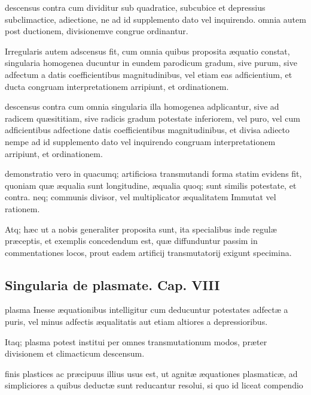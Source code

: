 \documentclass[11pt,a4paper]{article}
\begin{document}
descensus contra cum dividitur sub quadratice, subcubice et depressius subclimactice, adiectione, ne ad id supplemento dato vel inquirendo. omnia autem post ductionem, divisionemve congrue ordinantur.

Irregularis autem adscensus fit, cum omnia quibus proposita æquatio constat, singularia homogenea ducuntur in eundem parodicum gradum, sive purum, sive adfectum a datis coefficientibus magnitudinibus, vel etiam eas adficientium, et ducta congruam interpretationem arripiunt, et ordinationem.

descensus contra cum omnia singularia illa homogenea adplicantur, sive ad radicem quæsititiam, sive radicis gradum potestate inferiorem, vel puro, vel cum adficientibus adfectione datis coefficientibus magnitudinibus, et divisa adiecto nempe ad id supplemento dato vel inquirendo congruam interpretationem arripiunt, et ordinationem.

demonstratio vero in quacumq; artificiosa transmutandi forma statim evidens fit, quoniam quæ æqualia sunt longitudine, æqualia quoq; sunt similis potestate, et contra. neq; communis divisor, vel multiplicator æqualitatem Immutat vel rationem.

Atq; hæc ut a nobis generaliter proposita sunt, ita specialibus inde regulæ præceptis, et exemplis concedendum est, quæ diffunduntur passim in commentationes locos, prout eadem artificij transmutatorij exigunt specimina.

\subsection*{Singularia de plasmate. Cap. VIII}

plasma Inesse æquationibus intelligitur cum deducuntur potestates adfectæ a puris, vel minus adfectis æqualitatis aut etiam altiores a depressioribus.

Itaq; plasma potest institui per omnes transmutationum modos, præter divisionem et climacticum descensum.

finis plastices ac præcipuus illius usus est, ut agnitæ æquationes plasmaticæ, ad simpliciores a quibus deductæ sunt reducantur resolui, si quo id liceat compendio
\end{document}
